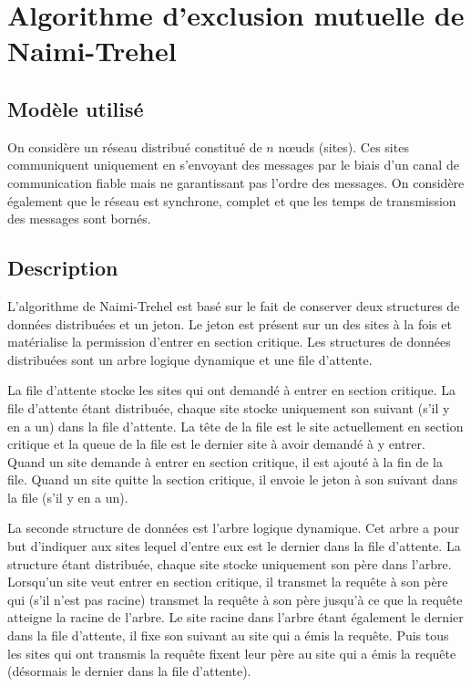 
\chapter{Algorithme d'exclusion mutuelle de Naimi-Trehel}\label{naimi-trehel}

\section{Modèle utilisé}
On considère un réseau distribué constitué de $n$ nœuds (sites). Ces sites communiquent uniquement en s'envoyant des messages par le biais d'un canal de communication fiable mais ne garantissant pas l'ordre des messages. On considère également que le réseau est synchrone, complet et que les temps de transmission des messages sont bornés.

\section{Description}
L'algorithme de Naimi-Trehel \cite{naimi1996} est basé sur le fait de conserver deux structures de données distribuées et un jeton. Le jeton est présent sur un des sites à la fois et matérialise la permission d'entrer en section critique. Les structures de données distribuées sont un arbre logique dynamique et une file d'attente.

La file d'attente stocke les sites qui ont demandé à entrer en section critique. La file d'attente étant distribuée, chaque site stocke uniquement son suivant (s'il y en a un) dans la file d'attente. La tête de la file est le site actuellement en section critique et la queue de la file est le dernier site à avoir demandé à y entrer. Quand un site demande à entrer en section critique, il est ajouté à la fin de la file. Quand un site quitte la section critique, il envoie le jeton à son suivant dans la file (s'il y en a un).

La seconde structure de données est l'arbre logique dynamique. Cet arbre a pour but d'indiquer aux sites lequel d'entre eux est le dernier dans la file d'attente. La structure étant distribuée, chaque site stocke uniquement son père dans l'arbre. Lorsqu'un site veut entrer en section critique, il transmet la requête à son père qui (s'il n'est pas racine) transmet la requête à son père jusqu'à ce que la requête atteigne la racine de l'arbre. Le site racine dans l'arbre étant également le dernier dans la file d'attente, il fixe son suivant au site qui a émis la requête. Puis tous les sites qui ont transmis la requête fixent leur père au site qui a émis la requête (désormais le dernier dans la file d'attente).


